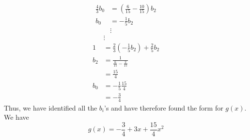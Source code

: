 \documentclass[a4paper, 11pt]{article}
\newenvironment{solution}{%
	\begin{list}{}{%
			\setlength{\topsep}{0pt}%
			\setlength{\leftmargin}{1.5cm}%
			\setlength{\rightmargin}{1.5cm}%
			\setlength{\listparindent}{\parindent}%
			\setlength{\itemindent}{\parindent}%
			\setlength{\parsep}{\parskip}%
		}%
		\item[]}{\end{list}}
\begin{document}
\begin{solution}
\begin{align*}
    \frac{4}{3}b_0 &= \left(\frac{6}{15}-\frac{10}{15}\right)b_2 \\
    b_0 &= -\frac{1}{5}b_2\\
    &\vdots
  \end{align*}
  \begin{align*}
    &  \vdots \\
    1 &= \frac{2}{3}\left(-\frac{1}{5}b_2\right)+\frac{2}{5}b_2 \\
    b_2 &= \frac{1}{\frac{6}{15}-\frac{2}{15}} \\
    &= \frac{15}{4} \\
    b_0 &= -\frac{1}{5}\frac{15}{4} \\
    &= -\frac{3}{4}
  \end{align*}
  Thus, we have identified all the $b_i$'s and have therefore found the form for $g(x)$. We have
  \begin{equation*}
    g(x) = -\frac{3}{4} + 3x + \frac{15}{4}x^2
  \end{equation*}

\end{solution}
\end{document}
